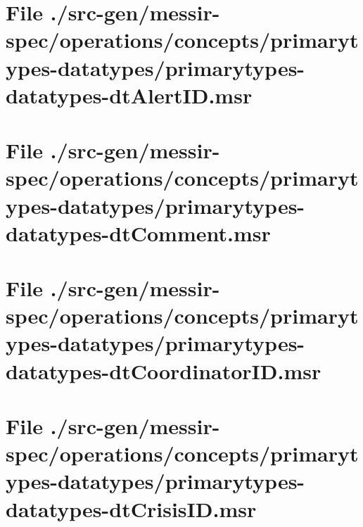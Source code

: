 \section[File /src-gen/messir-spec/operations.../primarytypes-datatypes-dtAlertID.msr]{File ./src-gen/messir-spec/operations/concepts/primarytypes-datatypes/primarytypes-datatypes-dtAlertID.msr}
\scriptsize

\normalsize
	
\section[File /src-gen/messir-spec/operations.../primarytypes-datatypes-dtComment.msr]{File ./src-gen/messir-spec/operations/concepts/primarytypes-datatypes/primarytypes-datatypes-dtComment.msr}
\scriptsize

\normalsize
	
\section[File /src-gen/messir-spec.../primarytypes-datatypes-dtCoordinatorID.msr]{File ./src-gen/messir-spec/operations/concepts/primarytypes-datatypes/primarytypes-datatypes-dtCoordinatorID.msr}
\scriptsize

\normalsize
	
\section[File /src-gen/messir-spec/operations.../primarytypes-datatypes-dtCrisisID.msr]{File ./src-gen/messir-spec/operations/concepts/primarytypes-datatypes/primarytypes-datatypes-dtCrisisID.msr}
\scriptsize

\normalsize
	
